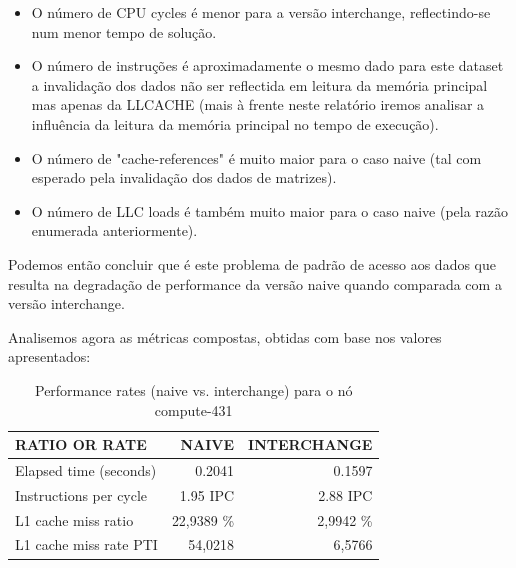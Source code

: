 \documentclass[conference,compsoc]{IEEEtran}
\begin{document}
\begin{itemize}
\begin{itemize}
\item O número de CPU cycles é menor para a versão interchange, reflectindo-se num menor tempo de solução.
\item O número de instruções é aproximadamente o mesmo dado para este dataset a invalidação dos dados não ser reflectida em leitura da memória principal mas apenas da LLCACHE (mais à frente neste relatório iremos analisar a influência da leitura da memória principal no tempo de execução).
\item O número de "cache-references" é muito maior para o caso naive (tal com esperado pela invalidação dos dados de matrizes).
\item O número de LLC loads é também muito maior para o caso naive (pela razão enumerada anteriormente).
\end{itemize}
Podemos então concluir que é este problema de padrão de acesso aos dados que resulta na degradação de performance da versão naive quando comparada com a versão interchange.\par 
Analisemos agora as métricas compostas, obtidas com base nos valores apresentados:


  \begin{table}[H]
  \caption{Performance rates (naive vs. interchange) para o nó compute-431}
  \label{table:search_rates}
  \centering
  \begin{tabular}{ | l | r | r |   }

  \hline
  RATIO OR RATE		 & NAIVE  & INTERCHANGE \\ \hline 
  Elapsed time (seconds) & 0.2041 & 0.1597   \\ \hline      
  
  Instructions per cycle  & 1.95  IPC & 2.88 IPC       \\ \hline      
  
          
  
  
  L1 cache miss ratio	  & 22,9389 \%   &     2,9942 \%    \\ \hline      
   

  L1 cache miss rate PTI &  54,0218 &     6,5766    \\ \hline     


\end{tabular}
\end{table}
\end{itemize}
\end{document}
